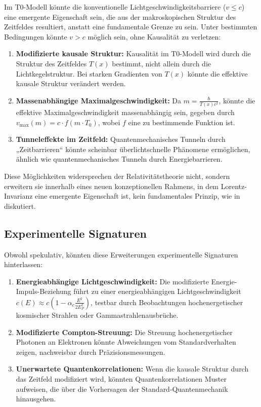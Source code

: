 \documentclass[12pt,a4paper]{article}
\newcommand{\Tfield}{T(x)}
\newcommand{\Tzero}{T_0}
\begin{document}
	Im T0-Modell könnte die konventionelle Lichtgeschwindigkeitsbarriere (\(v \leq c\)) eine emergente Eigenschaft sein, die aus der makroskopischen Struktur des Zeitfeldes resultiert, anstatt eine fundamentale Grenze zu sein. Unter bestimmten Bedingungen könnte \(v > c\) möglich sein, ohne Kausalität zu verletzen:
	
	\begin{enumerate}
		\item \textbf{Modifizierte kausale Struktur:} Kausalität im T0-Modell wird durch die Struktur des Zeitfeldes \(\Tfield\) bestimmt, nicht allein durch die Lichtkegelstruktur. Bei starken Gradienten von \(\Tfield\) könnte die effektive kausale Struktur verändert werden.
		\item \textbf{Massenabhängige Maximalgeschwindigkeit:} Da \(m = \frac{\hbar}{\Tfield c^2}\), könnte die effektive Maximalgeschwindigkeit massenabhängig sein, gegeben durch \(v_{\text{max}}(m) = c \cdot f(m \cdot \Tzero)\), wobei \(f\) eine zu bestimmende Funktion ist.
		\item \textbf{Tunneleffekte im Zeitfeld:} Quantenmechanisches Tunneln durch „Zeitbarrieren“ könnte scheinbar überlichtschnelle Phänomene ermöglichen, ähnlich wie quantenmechanisches Tunneln durch Energiebarrieren.
	\end{enumerate}
	
	Diese Möglichkeiten widersprechen der Relativitätstheorie nicht, sondern erweitern sie innerhalb eines neuen konzeptionellen Rahmens, in dem Lorentz-Invarianz eine emergente Eigenschaft ist, kein fundamentales Prinzip, wie in \cite{pascher_zeit_masse_2025} diskutiert.
	
	\subsection{Experimentelle Signaturen}
	\label{subsec:experimental_signatures}
	
	Obwohl spekulativ, könnten diese Erweiterungen experimentelle Signaturen hinterlassen:
	
	\begin{enumerate}
		\item \textbf{Energieabhängige Lichtgeschwindigkeit:} Die modifizierte Energie-Impuls-Beziehung führt zu einer energieabhängigen Lichtgeschwindigkeit \(c(E) \approx c (1 - \alpha_c \frac{E^2}{2E_P^2})\), testbar durch Beobachtungen hochenergetischer kosmischer Strahlen oder Gammastrahlenausbrüche.
		\item \textbf{Modifizierte Compton-Streuung:} Die Streuung hochenergetischer Photonen an Elektronen könnte Abweichungen vom Standardverhalten zeigen, nachweisbar durch Präzisionsmessungen.
		\item \textbf{Unerwartete Quantenkorrelationen:} Wenn die kausale Struktur durch das Zeitfeld modifiziert wird, könnten Quantenkorrelationen Muster aufweisen, die über die Vorhersagen der Standard-Quantenmechanik hinausgehen.
	\end{enumerate}
	
\end{document}
